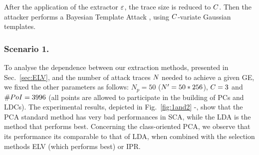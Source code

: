 After the application of the extractor $\extract$, the trace size is reduced to $\newTraceLength$. Then the attacker performs a Bayesian Template Attack \cite{Chari2003}, using $\newTraceLength$-variate Gaussian templates.



\subsubsection{Scenario 1.}
To analyse the dependence between our extraction methods, presented in Sec.~\ref{sec:ELV}, and the number of attack traces $\numTraces[]$ needed to achieve a given GE, we fixed the other parameters as follows: $N_p=50$ ($\numTraces[]'=50*256$), $\newTraceLength = 3$ and $\numPoI = 3996$ (all points are allowed to participate in the building of PCs and LDCs). The experimental results, depicted in Fig.~\ref{fig:1and2} -, show that the PCA standard method has very bad performances in SCA, while the LDA is the method that performs best. Concerning the class-oriented PCA, we observe that its performance its comparable to that of LDA, when combined with the selection methods ELV (which performs best) or IPR.  

